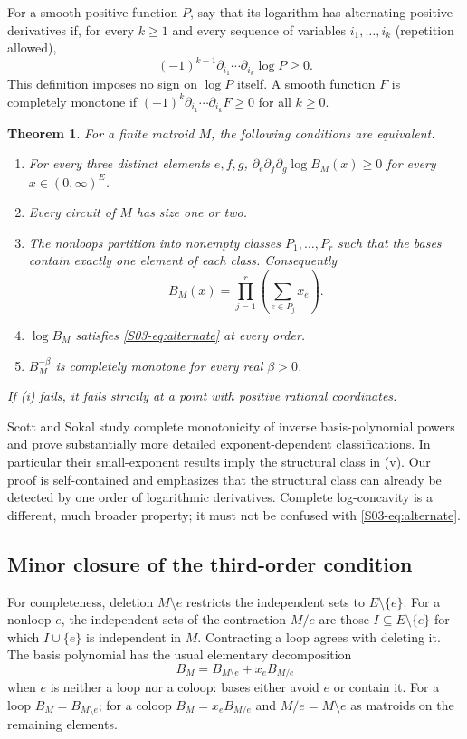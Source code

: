 \documentclass[11pt,a4paper]{article}
\newtheorem{theorem}{Theorem}[section]
\theoremstyle{definition}\newtheorem{definition}[theorem]{Definition}
\theoremstyle{remark}\newtheorem{remark}[theorem]{Remark}
\numberwithin{equation}{section}
\begin{document}
For a smooth positive function $P$, say that its logarithm has alternating positive derivatives if, for every $k\ge1$ and every sequence of variables $i_1,\ldots,i_k$ (repetition allowed),
\begin{equation}\label{S03-eq:alternate}
 (-1)^{k-1}\partial_{i_1}\cdots\partial_{i_k}\log P\ge0.
\end{equation}
This definition imposes no sign on $\log P$ itself. A smooth function $F$ is completely monotone if $(-1)^k\partial_{i_1}\cdots\partial_{i_k}F\ge0$ for all $k\ge0$.

\begin{theorem}\label{S03-thm:matroid}
For a finite matroid $M$, the following conditions are equivalent.
\begin{enumerate}[label=(\roman*)]
 \item For every three distinct elements $e,f,g$, $\partial_e\partial_f\partial_g\log B_M(x)\ge0$ for every $x\in(0,\infty)^E$.
 \item Every circuit of $M$ has size one or two.
 \item The nonloops partition into nonempty classes $P_1,\ldots,P_r$ such that the bases contain exactly one element of each class. Consequently
 \[
 B_M(x)=\prod_{j=1}^r\left(\sum_{e\in P_j}x_e\right).
 \]
 \item $\log B_M$ satisfies \eqref{S03-eq:alternate} at every order.
 \item $B_M^{-\beta}$ is completely monotone for every real $\beta>0$.
\end{enumerate}
If (i) fails, it fails strictly at a point with positive rational coordinates.
\end{theorem}

Scott and Sokal \cite{ref005} study complete monotonicity of inverse basis-polynomial powers and prove substantially more detailed exponent-dependent classifications. In particular their small-exponent results imply the structural class in (v). Our proof is self-contained and emphasizes that the structural class can already be detected by one order of logarithmic derivatives. Complete log-concavity is a different, much broader property; it must not be confused with \eqref{S03-eq:alternate}.

\subsection{Minor closure of the third-order condition}\label{S03-sec-2}
For completeness, deletion $M\setminus e$ restricts the independent sets to $E\setminus\{e\}$. For a nonloop $e$, the independent sets of the contraction $M/e$ are those $I\subseteq E\setminus\{e\}$ for which $I\cup\{e\}$ is independent in $M$. Contracting a loop agrees with deleting it. The basis polynomial has the usual elementary decomposition
\begin{equation}\label{S03-eq:delcon}
 B_M=B_{M\setminus e}+x_eB_{M/e}
\end{equation}
when $e$ is neither a loop nor a coloop: bases either avoid $e$ or contain it. For a loop $B_M=B_{M\setminus e}$; for a coloop $B_M=x_eB_{M/e}$ and $M/e=M\setminus e$ as matroids on the remaining elements.
\end{document}
